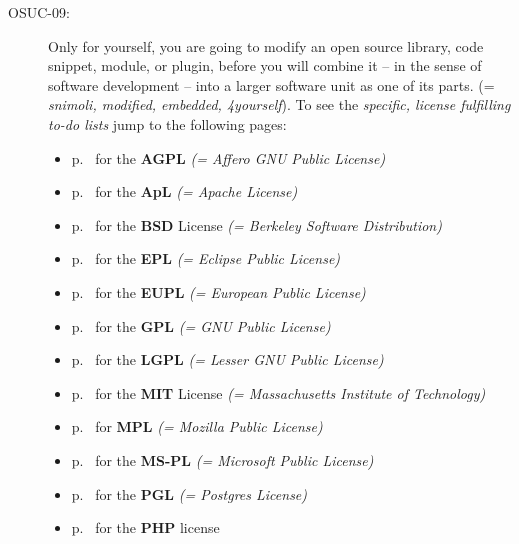 \begin{description}
\item[OSUC-09:]\label{OSUC-09-DEF} Only for yourself, you are going to modify an
open source library, code snippet, module, or plugin, before you will combine it
-- in the sense of software development -- into a larger software unit as one of
its parts. (= \textit{snimoli, modified, embedded, 4yourself}). 
To see the \textit{specific, license fulfilling to-do lists} jump to the
following pages:
  \begin{itemize}
    \item p.\ \pageref{OSUC-09-AGPL} for the \textbf{AGPL}
      \textit{(= Affero GNU Public License)} 
    \item p.\ \pageref{OSUC-09-Apache20} for the \textbf{ApL}
      \textit{(= Apache License)}
    \item p.\ \pageref{OSUC-09-BSD} for the \textbf{BSD} License
      \textit{(= Berkeley Software Distribution)}
    \item p.\ \pageref{OSUC-09-EPL} for the \textbf{EPL}
      \textit{(= Eclipse Public License)}     
    \item p.\ \pageref{OSUC-09-EUPL} for the \textbf{EUPL}
      \textit{(= European Public License)} 
    \item p.\ \pageref{OSUC-09-GPL} for the \textbf{GPL}
       \textit{(= GNU Public License)} 
    \item p.\ \pageref{OSUC-09-LGPL} for the \textbf{LGPL}
      \textit{(= Lesser GNU Public License)}           
    \item p.\ \pageref{OSUC-09-MIT} for the \textbf{MIT} License
       \textit{(= Massachusetts Institute of Technology)} 
    \item p.\ \pageref{OSUC-09-MPL} for \textbf{MPL}
      \textit{(= Mozilla Public License)}     
    \item p.\ \pageref{OSUC-09-MS-PL} for the \textbf{MS-PL}
      \textit{(= Microsoft Public License)} 
    \item p.\ \pageref{OSUC-09-PGL} for the \textbf{PGL}
      \textit{(= Postgres License)} 
    \item p.\ \pageref{OSUC-09-PHP} for the \textbf{PHP} license 
  \end{itemize}



\end{description}
